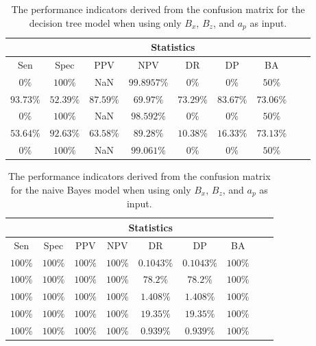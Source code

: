 \begin{table}[!ht]
	\centering
	\begin{tabular}{|c|c|c|c|c|c|c|c|c|}
		\hline
		 & \multicolumn{7}{c|}{Statistics} \\ \hline
		Sen & Spec & PPV & NPV & DR & DP & BA \\ \hline
		$0\%$ & $100\%$ & NaN & $99.8957\%$ & $0\%$ & $0\%$ & $50\%$ \\ \hline
		$93.73\%$ & $52.39\%$ & $87.59\%$ & $69.97\%$ & $73.29\%$ & $83.67\%$ & $73.06\%$ \\ \hline
		$0\%$ & $100\%$ & NaN & $98.592\%$ & $0\%$ & $0\%$ & $50\%$ \\ \hline
		$53.64\%$ & $92.63\%$ & $63.58\%$ & $89.28\%$ & $10.38\%$ & $16.33\%$ & $73.13\%$ \\ \hline
		$0\%$ & $100\%$ & NaN & $99.061\%$ & $0\%$ & $0\%$ & $50\%$ \\ \hline
	\end{tabular}
	\caption{The performance indicators derived from the confusion matrix for the decision tree model when using only $B_{x}$, $B_{z}$, and $a_{p}$ as input.}
	\label{tab:cs:xzap:C5.0}
\end{table}

\begin{table}[!ht]
	\centering
	\begin{tabular}{|c|c|c|c|c|c|c|c|c|}
		\hline
		 & \multicolumn{7}{c|}{Statistics} \\ \hline
		Sen & Spec & PPV & NPV & DR & DP & BA \\ \hline
		$100\%$ & $100\%$ & $100\%$ & $100\%$ & $0.1043\%$ & $0.1043\%$ & $100\%$ \\ \hline
		$100\%$ & $100\%$ & $100\%$ & $100\%$ & $78.2\%$ & $78.2\%$ & $100\%$ \\ \hline
		$100\%$ & $100\%$ & $100\%$ & $100\%$ & $1.408\%$ & $1.408\%$ & $100\%$ \\ \hline
		$100\%$ & $100\%$ & $100\%$ & $100\%$ & $19.35\%$ & $19.35\%$ & $100\%$ \\ \hline
		$100\%$ & $100\%$ & $100\%$ & $100\%$ & $0.939\%$ & $0.939\%$ & $100\%$ \\ \hline
	\end{tabular}
	\caption{The performance indicators derived from the confusion matrix for the naive Bayes model when using only $B_{x}$, $B_{z}$, and $a_{p}$ as input.}
	\label{tab:cs:xzap:nb}
\end{table}

